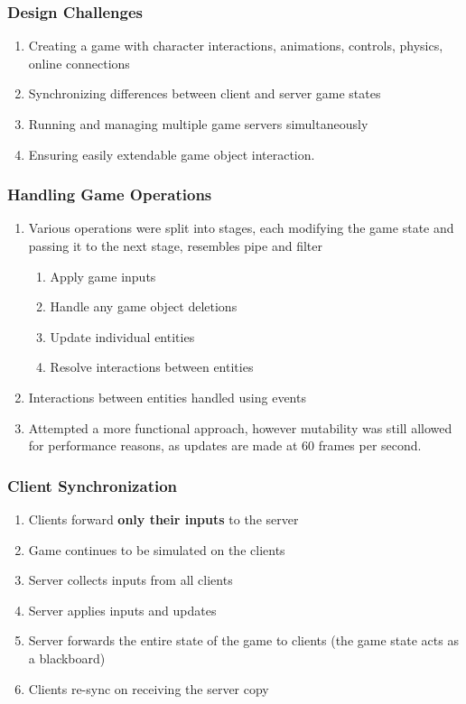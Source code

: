 \documentclass{beamer}
\begin{document}

\begin{frame}
\frametitle{Design Challenges}
\begin{enumerate}
  \item Creating a game with character interactions, animations, controls, physics, online connections
  \item Synchronizing differences between client and server game states
  \item Running and managing multiple game servers simultaneously
  \item Ensuring easily extendable game object interaction. 
\end{enumerate}
\end{frame}

\begin{frame}
\frametitle{Handling Game Operations}
\begin{enumerate}
  \item Various operations were split into stages, each modifying the game state
    and passing it to the next stage, resembles pipe and filter
    \begin{enumerate}
      \item Apply game inputs
      \item Handle any game object deletions
      \item Update individual entities
      \item Resolve interactions between entities
    \end{enumerate}
  \item Interactions between entities handled using events
  \item Attempted a more functional approach, however mutability was still
    allowed for performance reasons, as updates are made at 60 frames per
    second.
\end{enumerate}
\end{frame}

\begin{frame}
\frametitle{Client Synchronization}
\begin{enumerate}
  \item Clients forward \textbf{only their inputs} to the server
  \item Game continues to be simulated on the clients
  \item Server collects inputs from all clients
  \item Server applies inputs and updates
  \item Server forwards the entire state of the game to clients (the game state
    acts as a blackboard)
  \item Clients re-sync on receiving the server copy
\end{enumerate}
\end{frame}
\end{document}
